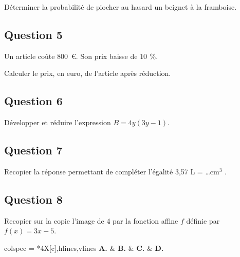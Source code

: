 \documentclass[12pt,a4paper,french]{article}
\begin{document}
Déterminer la probabilité de piocher au hasard un beignet à la framboise.



\subsection*{Question 5}

\medskip

Un article coûte $800$~\euro{}. Son prix baisse de $10~\,\%$.

Calculer le prix, en euro, de l'article après réduction.



\subsection*{Question 6}

\medskip

Développer et réduire l'expression $B = 4y(3y - 1)$.



\subsection*{Question 7}

\medskip

Recopier la réponse permettant de compléter l'égalité 3,57 L = \ldots cm$^3$
.


\subsection*{Question 8}

\medskip

Recopier sur la copie l'image de 4 par la fonction affine $f$ définie par $f(x) = 3x - 5$.

\begin{tblr}{colspec = {*4{X[c]}},hlines,vlines}
	\textbf{A.} &
	\textbf{B.} &
	\textbf{C.} &
	\textbf{D.}\\
\end{tblr}
\end{document}
